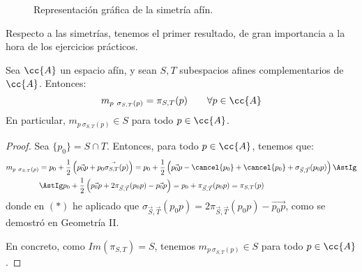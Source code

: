 \begin{figure}[H]
    \caption{Representación gráfica de la simetría afín.}
\end{figure}

Respecto a las simetrías, tenemos el primer resultado, de gran importancia a la hora de los ejercicios prácticos.
\begin{prop}
    Sea $\cc{A}$ un espacio afín, y sean $S,T$ subespacios afines complementarios de $\cc{A}$. Entonces:
    \begin{equation*}
        m_{p~\sigma_{S,T}(p)} = \pi_{S,T}(p) \qquad \forall p\in \cc{A}
    \end{equation*}
    En particular, $m_{p~\sigma_{S,T}(p)}\in S$ para todo $p\in \cc{A}$.
\end{prop}
\begin{proof}
    Sea $\{p_0\}=S\cap T$. Entonces, para todo $p\in \cc{A}$, tenemos que:
    \begin{align*}
        m_{p~\sigma_{S,T}(p)}
        &= p_0 + \frac{1}{2}\left(\vec{p_0p} + \vec{p_0\sigma_{S,T}(p)}\right)
        = p_0 + \frac{1}{2}\left(\vec{p_0p} -\cancel{p_0} + \cancel{p_0} + \sigma_{\vec{S},\vec{T}}(p_0p)\right)
        \AstIg \\ &\AstIg
        p_0 + \frac{1}{2}\left(\vec{p_0p} + 2\pi_{\vec{S},\vec{T}}(p_0p) - \vec{p_0p}\right)
        = p_0 + \pi_{\vec{S},\vec{T}}(p_0p) = \pi_{S,T}(p)
    \end{align*}
    donde en $(\ast)$ he aplicado que $\sigma_{\vec{S},\vec{T}}(p_0p) = 2\pi_{\vec{S},\vec{T}}(p_0p) - \vec{p_0p}$, como se demostró en Geometría II.

    En concreto, como $Im(\pi_{S,T})=S$, tenemos $m_{p~\sigma_{S,T}(p)}\in S$ para todo $p\in \cc{A}$.
\end{proof}

